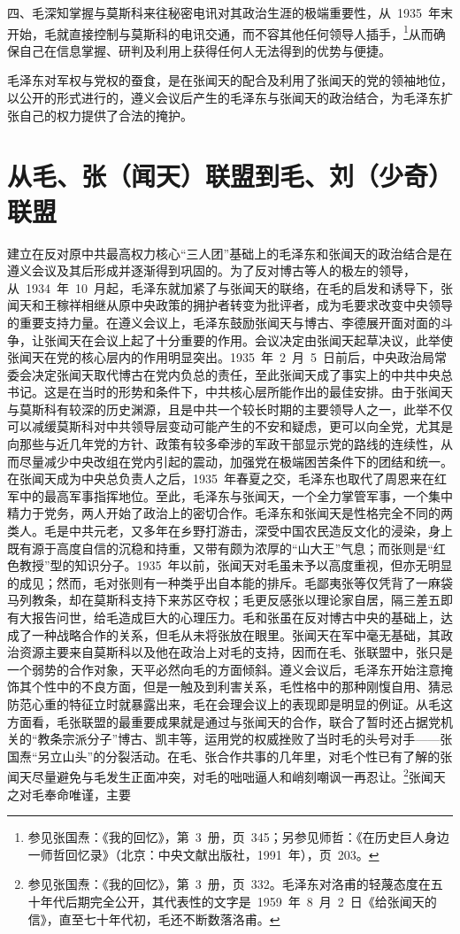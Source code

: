 四、毛深知掌握与莫斯科来往秘密电讯对其政治生涯的极端重要性，从~1935~年末开始，毛就直接控制与莫斯科的电讯交通，而不容其他任何领导人插手，\footnote{参见张国焘：《我的回忆》，第~3~册，页~345；另参见师哲：《在历史巨人身边一师哲回忆录》（北京：中央文献出版社，1991~年），页~203。}从而确保自己在信息掌握、研判及利用上获得任何人无法得到的优势与便捷。

毛泽东对军权与党权的蚕食，是在张闻天的配合及利用了张闻天的党的领袖地位，以公开的形式进行的，遵义会议后产生的毛泽东与张闻天的政治结合，为毛泽东扩张自己的权力提供了合法的掩护。

\section{从毛、张（闻天）联盟到毛、刘（少奇）联盟}

建立在反对原中共最高权力核心“三人团”基础上的毛泽东和张闻天的政治结合是在遵义会议及其后形成并逐渐得到巩固的。为了反对博古等人的极左的领导，从~1934~年~10~月起，毛泽东就加紧了与张闻天的联络，在毛的启发和诱导下，张闻天和王稼祥相继从原中央政策的拥护者转变为批评者，成为毛要求改变中央领导的重要支持力量。在遵义会议上，毛泽东鼓励张闻天与博古、李德展开面对面的斗争，让张闻天在会议上起了十分重要的作用。会议决定由张闻天起草决议，此举使张闻天在党的核心层内的作用明显突出。1935~年~2~月~5~日前后，中央政治局常委会决定张闻天取代博古在党内负总的责任，至此张闻天成了事实上的中共中央总书记。这是在当时的形势和条件下，中共核心层所能作出的最佳安排。由于张闻天与莫斯科有较深的历史渊源，且是中共一个较长时期的主要领导人之一，此举不仅可以减缓莫斯科对中共领导层变动可能产生的不安和疑虑，更可以向全党，尤其是向那些与近几年党的方针、政策有较多牵涉的军政干部显示党的路线的连续性，从而尽量减少中央改组在党内引起的震动，加强党在极端困苦条件下的团结和统一。在张闻天成为中央总负责人之后，1935~年春夏之交，毛泽东也取代了周恩来在红军中的最高军事指挥地位。至此，毛泽东与张闻天，一个全力掌管军事，一个集中精力于党务，两人开始了政治上的密切合作。毛泽东和张闻天是性格完全不同的两类人。毛是中共元老，又多年在乡野打游击，深受中国农民造反文化的浸染，身上既有源于高度自信的沉稳和持重，又带有颇为浓厚的“山大王”气息；而张则是“红色教授”型的知识分子。1935~年以前，张闻天对毛虽未予以高度重视，但亦无明显的成见；然而，毛对张则有一种类乎出自本能的排斥。毛鄙夷张等仅凭背了一麻袋马列教条，却在莫斯科支持下来苏区夺权；毛更反感张以理论家自居，隔三差五即有大报告问世，给毛造成巨大的心理压力。毛和张虽在反对博古中央的基础上，达成了一种战略合作的关系，但毛从未将张放在眼里。张闻天在军中毫无基础，其政治资源主要来自莫斯科以及他在政治上对毛的支持，因而在毛、张联盟中，张只是一个弱势的合作对象，天平必然向毛的方面倾斜。遵义会议后，毛泽东开始注意掩饰其个性中的不良方面，但是一触及到利害关系，毛性格中的那种刚愎自用、猜忌防范心重的特征立时就暴露出来，毛在会理会议上的表现即是明显的例证。从毛这方面看，毛张联盟的最重要成果就是通过与张闻天的合作，联合了暂时还占据党机关的“教条宗派分子”博古、凯丰等，运用党的权威挫败了当时毛的头号对手——张国焘“另立山头”的分裂活动。在毛、张合作共事的几年里，对毛个性已有了解的张闻天尽量避免与毛发生正面冲突，对毛的咄咄逼人和峭刻嘲讽一再忍让。\footnote{参见张国焘：《我的回忆》，第~3~册，页~332。毛泽东对洛甫的轻蔑态度在五十年代后期完全公开，其代表性的文字是~1959~年~8~月~2~日《给张闻天的信》，直至七十年代初，毛还不断数落洛甫。}张闻天之对毛奉命唯谨，主要